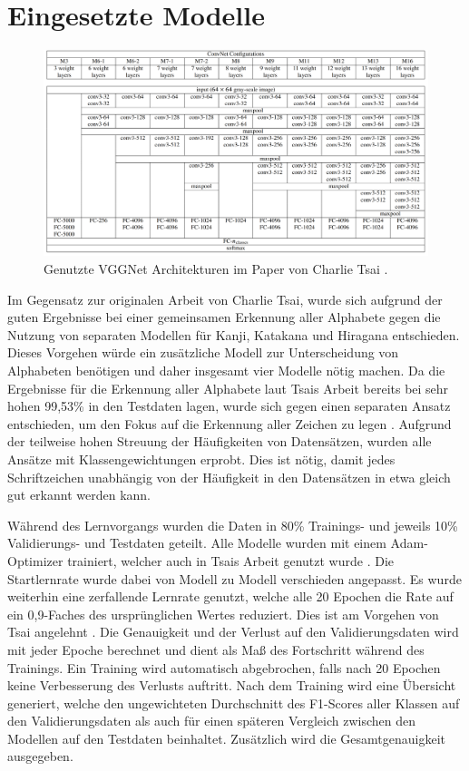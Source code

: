\documentclass[twoside,a4paper]{IEEEtran}
\begin{document}
\section{Eingesetzte Modelle}
\begin{figure}[!htb]
	\centering
	\includegraphics[width=2.1\columnwidth]{conv_net_architectures}
	\caption{Genutzte VGGNet Architekturen im Paper von Charlie Tsai \cite[S.3]{RHC}.}
	\label{vggnet}
\end{figure}
Im Gegensatz zur originalen Arbeit von Charlie Tsai, wurde sich aufgrund der guten Ergebnisse bei einer gemeinsamen Erkennung aller Alphabete gegen die Nutzung von separaten Modellen für Kanji, Katakana und Hiragana entschieden. Dieses Vorgehen würde ein zusätzliche Modell zur Unterscheidung von Alphabeten benötigen und daher insgesamt vier Modelle nötig machen. Da die Ergebnisse für die Erkennung aller Alphabete laut Tsais Arbeit bereits bei sehr hohen 99,53\% in den Testdaten lagen, wurde sich gegen einen separaten Ansatz entschieden, um den Fokus auf die Erkennung aller Zeichen zu legen \cite[S.4-6]{RHC}. Aufgrund der teilweise hohen Streuung der Häufigkeiten von Datensätzen, wurden alle Ansätze mit Klassengewichtungen erprobt. Dies ist nötig, damit jedes Schriftzeichen unabhängig von der Häufigkeit in den Datensätzen in etwa gleich gut erkannt werden kann.

Während des Lernvorgangs wurden die Daten in 80\% Trainings- und jeweils 10\% Validierungs- und Testdaten geteilt. Alle Modelle wurden mit einem Adam-Optimizer trainiert, welcher auch in Tsais Arbeit genutzt wurde \cite[S.4]{RHC}. Die Startlernrate wurde dabei von Modell zu Modell verschieden angepasst. Es wurde weiterhin eine zerfallende Lernrate genutzt, welche alle 20 Epochen die Rate auf ein 0,9-Faches des ursprünglichen Wertes reduziert. Dies ist am Vorgehen von Tsai angelehnt \cite[S.4]{RHC}. Die Genauigkeit und der Verlust auf den Validierungsdaten wird mit jeder Epoche berechnet und dient als Maß des Fortschritt während des Trainings. Ein Training wird automatisch abgebrochen, falls nach 20 Epochen keine Verbesserung des Verlusts auftritt. Nach dem Training wird eine Übersicht generiert, welche den ungewichteten Durchschnitt des F1-Scores aller Klassen auf den Validierungsdaten als auch für einen späteren Vergleich zwischen den Modellen auf den Testdaten beinhaltet. Zusätzlich wird die Gesamtgenauigkeit ausgegeben.
\end{document}
